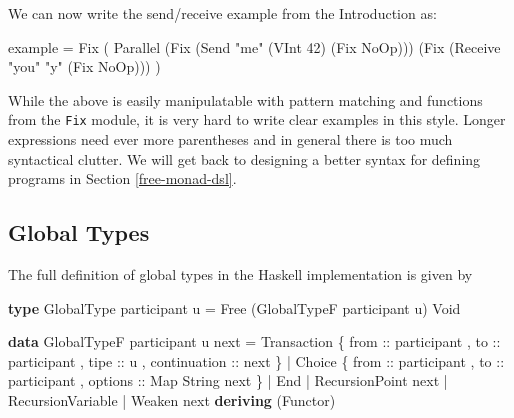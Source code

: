 \documentclass[runningheads,plain]{llncs}
\newenvironment{Shaded}{}{}
\newcommand{\KeywordTok}[1]{\textcolor[rgb]{0.00,0.44,0.13}{\textbf{#1}}}
\newcommand{\DataTypeTok}[1]{\textcolor[rgb]{0.56,0.13,0.00}{#1}}
\newcommand{\DecValTok}[1]{\textcolor[rgb]{0.25,0.63,0.44}{#1}}
\newcommand{\StringTok}[1]{\textcolor[rgb]{0.25,0.44,0.63}{#1}}
\newcommand{\OtherTok}[1]{\textcolor[rgb]{0.00,0.44,0.13}{#1}}
\newcommand{\FunctionTok}[1]{\textcolor[rgb]{0.02,0.16,0.49}{#1}}
\newcommand{\NormalTok}[1]{#1}
\begin{document}
We can now write the send/receive example from the Introduction as:

\begin{Shaded}
\begin{Highlighting}[]
\NormalTok{example }\FunctionTok{=} 
    \DataTypeTok{Fix} 
\NormalTok{        ( }\DataTypeTok{Parallel} 
\NormalTok{            (}\DataTypeTok{Fix}\NormalTok{ (}\DataTypeTok{Send} \StringTok{"me"}\NormalTok{ (}\DataTypeTok{VInt} \DecValTok{42}\NormalTok{) (}\DataTypeTok{Fix} \DataTypeTok{NoOp}\NormalTok{)))}
\NormalTok{            (}\DataTypeTok{Fix}\NormalTok{ (}\DataTypeTok{Receive} \StringTok{"you"} \StringTok{"y"}\NormalTok{ (}\DataTypeTok{Fix} \DataTypeTok{NoOp}\NormalTok{)))}
\NormalTok{        )}
\end{Highlighting}
\end{Shaded}

While the above is easily manipulatable with pattern matching and
functions from the \texttt{Fix} module, it is very hard to write clear
examples in this style. Longer expressions need ever more parentheses
and in general there is too much syntactical clutter. We will get back
to designing a better syntax for defining programs in Section
\ref{free-monad-dsl}.

\subsection{Global Types}
The full definition of global types in the Haskell implementation is
given by

\begin{Shaded}
\begin{Highlighting}[]
\KeywordTok{type} \DataTypeTok{GlobalType}\NormalTok{ participant u }\FunctionTok{=} 
    \DataTypeTok{Free}\NormalTok{ (}\DataTypeTok{GlobalTypeF}\NormalTok{ participant u) }\DataTypeTok{Void}

\KeywordTok{data} \DataTypeTok{GlobalTypeF}\NormalTok{ participant u next}
    \FunctionTok{=} \DataTypeTok{Transaction} 
\NormalTok{        \{}\OtherTok{ from ::}\NormalTok{ participant}
\NormalTok{        ,}\OtherTok{ to ::}\NormalTok{ participant}
\NormalTok{        ,}\OtherTok{ tipe ::}\NormalTok{ u}
\NormalTok{        ,}\OtherTok{ continuation ::}\NormalTok{  next }
\NormalTok{        \} }
    \FunctionTok{|} \DataTypeTok{Choice} 
\NormalTok{        \{}\OtherTok{ from ::}\NormalTok{ participant}
\NormalTok{        ,}\OtherTok{ to ::}\NormalTok{ participant}
\NormalTok{        ,}\OtherTok{ options ::} \DataTypeTok{Map} \DataTypeTok{String}\NormalTok{ next }
\NormalTok{        \}}
    \FunctionTok{|} \DataTypeTok{End}
    \FunctionTok{|} \DataTypeTok{RecursionPoint}\NormalTok{ next}
    \FunctionTok{|} \DataTypeTok{RecursionVariable}
    \FunctionTok{|} \DataTypeTok{Weaken}\NormalTok{ next}
    \KeywordTok{deriving}\NormalTok{ (}\DataTypeTok{Functor}\NormalTok{)}
\end{Highlighting}
\end{Shaded}
\end{document}
